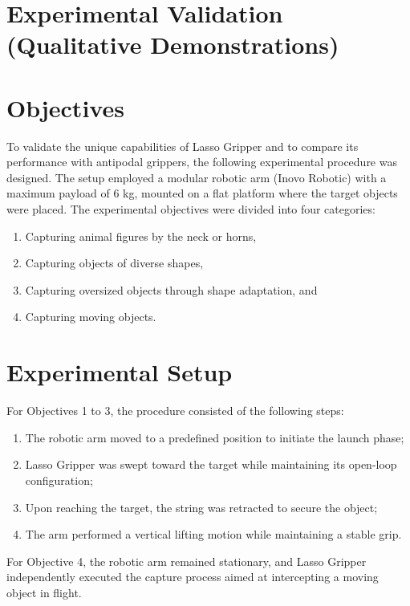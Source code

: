 \section{Experimental Validation (Qualitative Demonstrations)}
\label{Chapter6}


\section{Objectives}
To validate the unique capabilities of Lasso Gripper and to compare its performance with antipodal grippers, the following experimental procedure was designed. The setup employed a modular robotic arm (Inovo Robotic) with a maximum payload of 6 kg, mounted on a flat platform where the target objects were placed.
The experimental objectives were divided into four categories:

    \begin{enumerate}
        \item Capturing animal figures by the neck or horns,

        \item Capturing objects of diverse shapes,

        \item Capturing oversized objects through shape adaptation, and

        \item Capturing moving objects.
    \end{enumerate}

\section{Experimental Setup}
For Objectives 1 to 3, the procedure consisted of the following steps:

    \begin{enumerate}
        \item The robotic arm moved to a predefined position to initiate the launch phase;

        \item Lasso Gripper was swept toward the target while maintaining its open-loop configuration;

        \item Upon reaching the target, the string was retracted to secure the object;

        \item The arm performed a vertical lifting motion while maintaining a stable grip.
    \end{enumerate}
For Objective 4, the robotic arm remained stationary, and Lasso Gripper independently executed the capture process aimed at intercepting a moving object in flight.
